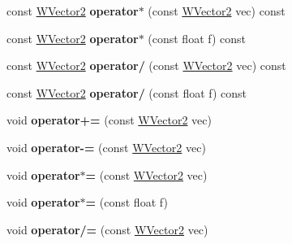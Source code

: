 \begin{DoxyCompactItemize}
\item 
const \hyperlink{class_w_vector2}{W\+Vector2} {\bfseries operator$\ast$} (const \hyperlink{class_w_vector2}{W\+Vector2} vec) const \hypertarget{class_w_vector2_aa9796d8d450471e8130902207fd19b64}{}\label{class_w_vector2_aa9796d8d450471e8130902207fd19b64}

\item 
const \hyperlink{class_w_vector2}{W\+Vector2} {\bfseries operator$\ast$} (const float f) const \hypertarget{class_w_vector2_a7ff02f4d0e4c034d4fb86867f3d4c18c}{}\label{class_w_vector2_a7ff02f4d0e4c034d4fb86867f3d4c18c}

\item 
const \hyperlink{class_w_vector2}{W\+Vector2} {\bfseries operator/} (const \hyperlink{class_w_vector2}{W\+Vector2} vec) const \hypertarget{class_w_vector2_a89d25f5faa63e1960afb6c943f9aa9ea}{}\label{class_w_vector2_a89d25f5faa63e1960afb6c943f9aa9ea}

\item 
const \hyperlink{class_w_vector2}{W\+Vector2} {\bfseries operator/} (const float f) const \hypertarget{class_w_vector2_a41e6c1a1c0675a8bf3aa8792a3a08fe6}{}\label{class_w_vector2_a41e6c1a1c0675a8bf3aa8792a3a08fe6}

\item 
void {\bfseries operator+=} (const \hyperlink{class_w_vector2}{W\+Vector2} vec)\hypertarget{class_w_vector2_ae121298d844fbcdd9f7e4d76d8739381}{}\label{class_w_vector2_ae121298d844fbcdd9f7e4d76d8739381}

\item 
void {\bfseries operator-\/=} (const \hyperlink{class_w_vector2}{W\+Vector2} vec)\hypertarget{class_w_vector2_a9e853d03f42dbf94815a8b64ebc03f9d}{}\label{class_w_vector2_a9e853d03f42dbf94815a8b64ebc03f9d}

\item 
void {\bfseries operator$\ast$=} (const \hyperlink{class_w_vector2}{W\+Vector2} vec)\hypertarget{class_w_vector2_af9f5e86abadcd6386aa12d7ab47bc990}{}\label{class_w_vector2_af9f5e86abadcd6386aa12d7ab47bc990}

\item 
void {\bfseries operator$\ast$=} (const float f)\hypertarget{class_w_vector2_a937cfe9e52be9c38e51705c0a47b09d4}{}\label{class_w_vector2_a937cfe9e52be9c38e51705c0a47b09d4}

\item 
void {\bfseries operator/=} (const \hyperlink{class_w_vector2}{W\+Vector2} vec)\hypertarget{class_w_vector2_a35df3d03ef59144b4f79db20053aaa9c}{}\label{class_w_vector2_a35df3d03ef59144b4f79db20053aaa9c}


\end{DoxyCompactItemize}
